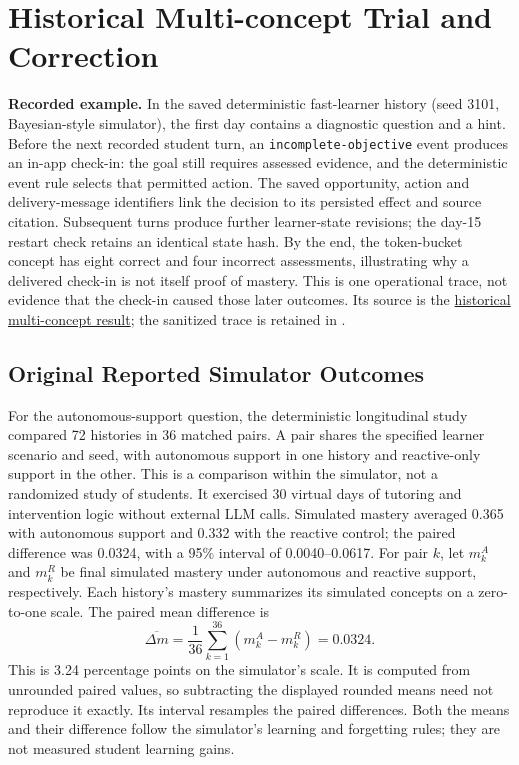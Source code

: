 \section{Historical Multi-concept Trial and Correction}\label{sec:historical-autonomy}
\textbf{Recorded example.} In the saved deterministic fast-learner history
(seed 3101, Bayesian-style simulator), the first day contains a diagnostic
question and a hint. Before the next recorded student turn, an
\texttt{incomplete-objective} event produces an in-app check-in: the goal still
requires assessed evidence, and the deterministic event rule selects that
permitted action. The saved opportunity, action and delivery-message identifiers
link the decision to its persisted effect and source citation. Subsequent turns
produce further learner-state revisions; the day-15 restart check retains an
identical state hash. By the end, the token-bucket concept has eight correct and
four incorrect assessments, illustrating why a delivered check-in is not itself
proof of mastery. This is one operational trace, not evidence that the check-in
caused those later outcomes. Its source is the \href{https://github.com/horiiiiii032929/digital-twin/blob/main/research/05_evaluation/governed-full-autonomy-v2-1-multi-concept-confirmation-025-results.md}{historical multi-concept result}; the sanitized trace is retained in
.


\subsection{Original Reported Simulator Outcomes}
For the autonomous-support question, the deterministic longitudinal study compared 72 histories in 36 matched pairs.
A pair shares the specified learner scenario and seed, with autonomous support
in one history and reactive-only support in the other. This is a comparison
within the simulator, not a randomized study of students.
It exercised 30 virtual days of tutoring and intervention logic without external
LLM calls. Simulated mastery averaged 0.365 with autonomous support and 0.332
with the reactive control; the paired difference was 0.0324, with a 95\% interval
of 0.0040--0.0617. For pair $k$, let $m_k^{A}$ and $m_k^{R}$ be final simulated mastery under
autonomous and reactive support, respectively. Each history's mastery summarizes
its simulated concepts on a zero-to-one scale. The paired mean difference is
\begin{equation}
\overline{\Delta m}=\frac{1}{36}\sum_{k=1}^{36}(m_k^{A}-m_k^{R})=0.0324.
\label{eq:mastery-difference}
\end{equation}
This is 3.24 percentage points on the simulator's scale. It is computed from
unrounded paired values, so subtracting the displayed rounded means need not
reproduce it exactly. Its interval resamples the paired differences. Both the
means and their difference follow the simulator's learning and forgetting rules;
they are not measured student learning gains.

